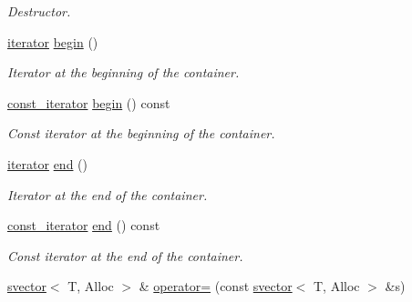 \begin{DoxyCompactItemize}
\begin{DoxyCompactList}\small\item\em Destructor. \end{DoxyCompactList}\item 
\hyperlink{classlgraph_1_1utils_1_1svector_a518288794e754e27d2e2274ced4485a6}{iterator} \hyperlink{classlgraph_1_1utils_1_1svector_aeb8b316c538de8368b1efdbf7764ac91}{begin} ()
\begin{DoxyCompactList}\small\item\em Iterator at the beginning of the container. \end{DoxyCompactList}\item 
\hyperlink{classlgraph_1_1utils_1_1svector_a50774ce617a742e76f3fb8cc0a7a9445}{const\+\_\+iterator} \hyperlink{classlgraph_1_1utils_1_1svector_a7345683988f337e5015850357ae08714}{begin} () const 
\begin{DoxyCompactList}\small\item\em Const iterator at the beginning of the container. \end{DoxyCompactList}\item 
\hyperlink{classlgraph_1_1utils_1_1svector_a518288794e754e27d2e2274ced4485a6}{iterator} \hyperlink{classlgraph_1_1utils_1_1svector_a07bc452bc6022b65a0399de60b600565}{end} ()
\begin{DoxyCompactList}\small\item\em Iterator at the end of the container. \end{DoxyCompactList}\item 
\hyperlink{classlgraph_1_1utils_1_1svector_a50774ce617a742e76f3fb8cc0a7a9445}{const\+\_\+iterator} \hyperlink{classlgraph_1_1utils_1_1svector_ab315a8270e95e35f27ff99d3bbc67bba}{end} () const 
\begin{DoxyCompactList}\small\item\em Const iterator at the end of the container. \end{DoxyCompactList}\item 
\hyperlink{classlgraph_1_1utils_1_1svector}{svector}$<$ T, Alloc $>$ \& \hyperlink{classlgraph_1_1utils_1_1svector_ad57a44da3d8b2459dbd209d5d8b7a3c9}{operator=} (const \hyperlink{classlgraph_1_1utils_1_1svector}{svector}$<$ T, Alloc $>$ \&s)\hypertarget{classlgraph_1_1utils_1_1svector_ad57a44da3d8b2459dbd209d5d8b7a3c9}{}\label{classlgraph_1_1utils_1_1svector_ad57a44da3d8b2459dbd209d5d8b7a3c9}


\end{DoxyCompactItemize}
